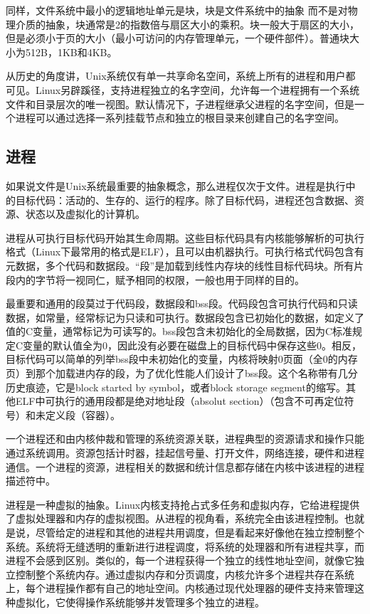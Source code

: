 同样，文件系统中最小的逻辑地址单元是块，块是文件系统中的抽象 而不是对物理介质的抽象，块通常是2的指数倍与扇区大小的乘积。块一般大于扇区的大小，但是必须小于页的大小（最小可访问的内存管理单元，一个硬件部件）。普通块大小为512B，1KB和4KB。

从历史的角度讲，Unix系统仅有单一共享命名空间，系统上所有的进程和用户都可见。Linux另辟蹊径，支持进程独立的名字空间，允许每一个进程拥有一个系统文件和目录层次的唯一视图。默认情况下，子进程继承父进程的名字空间，但是一个进程可以通过选择一系列挂载节点和独立的根目录来创建自己的名字空间。

\subsection{进程}

如果说文件是Unix系统最重要的抽象概念，那么进程仅次于文件。进程是执行中的目标代码：活动的、生存的、运行的程序。除了目标代码，进程还包含数据、资源、状态以及虚拟化的计算机。

进程从可执行目标代码开始其生命周期。这些目标代码具有内核能够解析的可执行格式（Linux下最常用的格式是ELF），且可以由机器执行。可执行格式代码包含有元数据，多个代码和数据段。“段”是加载到线性内存块的线性目标代码块。所有片段内的字节将一视同仁，赋予相同的权限，一般也用于同样的目的。

最重要和通用的段莫过于代码段，数据段和bss段。代码段包含可执行代码和只读数据，如常量，经常标记为只读和可执行。数据段包含已初始化的数据，如定义了值的C变量，通常标记为可读写的。bss段包含未初始化的全局数据，因为C标准规定C变量的默认值全为0，因此没有必要在磁盘上的目标代码中保存这些0。相反，目标代码可以简单的列举bss段中未初始化的变量，内核将映射0页面（全0的内存页）到那个加载进内存的段，为了优化性能人们设计了bss段。这个名称带有几分历史痕迹，它是block started by symbol，或者block storage segment的缩写。其他ELF中可执行的通用段都是绝对地址段（absolut section）（包含不可再定位符号）和未定义段（容器）。

一个进程还和由内核仲裁和管理的系统资源关联，进程典型的资源请求和操作只能通过系统调用。资源包括计时器，挂起信号量、打开文件，网络连接，硬件和进程通信。一个进程的资源，进程相关的数据和统计信息都存储在内核中该进程的进程描述符中。

进程是一种虚拟的抽象。Linux内核支持抢占式多任务和虚拟内存，它给进程提供了虚拟处理器和内存的虚拟视图。从进程的视角看，系统完全由该进程控制。也就是说，尽管给定的进程和其他的进程共用调度，但是看起来好像他在独立控制整个系统。系统将无缝透明的重新进行进程调度，将系统的处理器和所有进程共享，而进程不会感到区别。类似的，每一个进程获得一个独立的线性地址空间，就像它独立控制整个系统内存。通过虚拟内存和分页调度，内核允许多个进程共存在系统上，每个进程操作都有自己的地址空间。内核通过现代处理器的硬件支持来管理这种虚拟化，它使得操作系统能够并发管理多个独立的进程。

